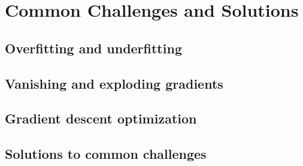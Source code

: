 
\chapter{Common Challenges and Solutions}

\section{Overfitting and underfitting}
\section{Vanishing and exploding gradients}
\section{Gradient descent optimization}
\section{Solutions to common challenges}
